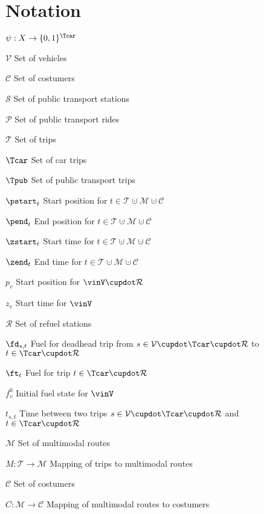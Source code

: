 \chapter*{Notation}

\begin{labeling}{$\psi:X\to\{0,1\}^{\Tcar}$}
	\item[$\mathcal{V}$]{Set of vehicles}
	\item[$\mathcal{C}$]{Set of costumers}
	\item[$\mathcal{S}$]{Set of public transport stations}
	\item[$\mathcal{P}$]{Set of public transport rides}
	\item[$\mathcal{T}$]{Set of trips}
	\item[$\Tcar$]{Set of car trips}
	\item[$\Tpub$]{Set of public transport trips}
	\item[$\pstart_t$]{Start position for $t\in\mathcal{T}\cupdot\mathcal{M}\cupdot\mathcal{C}$}
	\item[$\pend_t$]{End position for $t\in\mathcal{T}\cupdot\mathcal{M}\cupdot\mathcal{C}$}
	\item[$\zstart_t$]{Start time for $t\in\mathcal{T}\cupdot\mathcal{M}\cupdot\mathcal{C}$}
	\item[$\zend_t$]{End time for $t\in\mathcal{T}\cupdot\mathcal{M}\cupdot\mathcal{C}$}
	\item[$p_v$]{Start position for $\vinV\cupdot\mathcal{R}$}
	\item[$z_v$]{Start time for $\vinV$}
	\item[$\mathcal{R}$]{Set of refuel stations}
	\item[$\fd_{s,t}$]{Fuel for deadhead trip from $s\in\mathcal{V}\cupdot\Tcar\cupdot\mathcal{R}$ to $t\in\Tcar\cupdot\mathcal{R}$}
	\item[$\ft_t$]{Fuel for trip $t\in\Tcar\cupdot\mathcal{R}$}
	\item[$f^0_v$]{Initial fuel state for $\vinV$}
	\item[$t_{s,t}$]{Time between two trips $s\in\mathcal{V}\cupdot\Tcar\cupdot\mathcal{R}$ and $t\in\Tcar\cupdot\mathcal{R}$}
	\item[$\mathcal{M}$]{Set of multimodal routes}
	\item[$M:\mathcal{T}\to\mathcal{M}$]{Mapping of trips to multimodal routes}
	\item[$\mathcal{C}$]{Set of costumers}
	\item[$C:\mathcal{M}\to\mathcal{C}$]{Mapping of multimodal routes to costumers}

\end{labeling}
